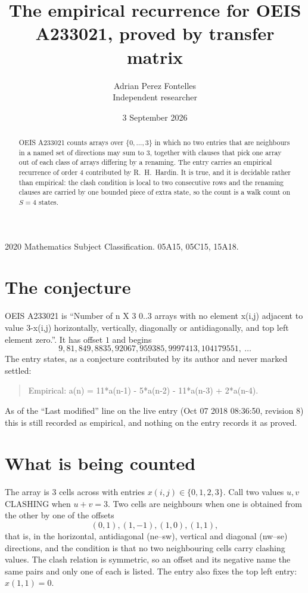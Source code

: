 \documentclass[11pt,a4paper]{article}
\title{The empirical recurrence for OEIS A233021, proved by transfer matrix}
\author{Adrian Perez Fontelles\\ \small Independent researcher}
\date{3 September 2026}
\theoremstyle{plain}
\theoremstyle{definition}
\begin{document}
\maketitle

\begin{abstract}
OEIS A233021 counts arrays over $\{0,\dots,3\}$ in which no two entries that are neighbours in
a named set of directions may sum to $3$, together with clauses that pick one array out of
each class of arrays differing by a renaming. The entry carries an empirical recurrence of
order $4$ contributed by R.~H.~Hardin. It is true, and it is decidable rather than
empirical: the clash condition is local to two consecutive rows and the renaming clauses are
carried by one bounded piece of extra state, so the count is a walk count on $S=4$ states.
\end{abstract}

\noindent\small 2020 Mathematics Subject Classification. 05A15, 05C15, 15A18.\normalsize

\section{The conjecture}

OEIS A233021 is ``Number of n X 3 0..3 arrays with no element x(i,j) adjacent to value 3-x(i,j) horizontally, vertically, diagonally or antidiagonally, and top left element zero.''. It has offset $1$ and begins
\[
9, 81, 849, 8835, 92067, 959385, 9997413, 104179551,\ \dots
\]
The entry states, as a conjecture contributed by its author and never marked settled:
\begin{quote}
Empirical: a(n) = 11*a(n-1) - 5*a(n-2) - 11*a(n-3) + 2*a(n-4).
\end{quote}
As of the ``Last modified'' line on the live entry (Oct 07 2018 08:36:50, revision 8) this is still
recorded as empirical, and nothing on the entry records it as proved.

\section{What is being counted}

The array is $3$ cells across with entries $x(i,j)\in\{0,1,2,3\}$. Call two values $u,v$ CLASHING
when $u+v=3$. Two cells are neighbours when one is obtained from the other by one of
the offsets
\[
(0,1), (1,-1), (1,0), (1,1),
\]
that is, in the horizontal, antidiagonal (ne--sw), vertical and diagonal (nw--se) directions, and the condition is that no two neighbouring cells carry
clashing values. The clash relation is symmetric, so an offset and its negative name the
same pairs and only one of each is listed. The entry also fixes the top left entry: $x(1,1)=0$.
\end{document}

